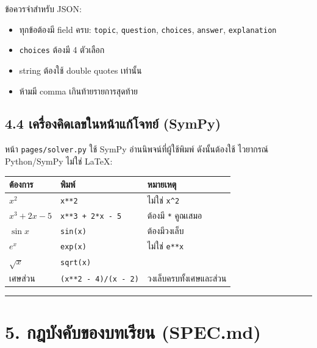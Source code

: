 \documentclass[
  thai,
  12pt,
  letterpaper,
  DIV=11,
  numbers=noendperiod]{scrartcl}
\newcounter{none} %
\providecommand{\tightlist}{%
  \setlength{\itemsep}{0pt}\setlength{\parskip}{0pt}}
\begin{document}
ข้อควรจำสำหรับ JSON:

\begin{itemize}
\tightlist
\item
  ทุกข้อต้องมี field ครบ: \texttt{topic}, \texttt{question},
  \texttt{choices}, \texttt{answer}, \texttt{explanation}
\item
  \texttt{choices} ต้องมี 4 ตัวเลือก
\item
  string ต้องใช้ double quotes เท่านั้น
\item
  ห้ามมี comma เกินท้ายรายการสุดท้าย
\end{itemize}

\subsection{4.4 เครื่องคิดเลขในหน้าแก้โจทย์
(SymPy)}\label{uxe40uxe04uxe23uxe2duxe07uxe04uxe14uxe40uxe25uxe02uxe43uxe19uxe2buxe19uxe32uxe41uxe01uxe42uxe08uxe17uxe22-sympy}

หน้า \texttt{pages/solver.py} ใช้ SymPy อ่านนิพจน์ที่ผู้ใช้พิมพ์ ดังนั้นต้องใช้ ไวยากรณ์
Python/SymPy ไม่ใช่ LaTeX:

{\def\LTcaptype{none} %
\begin{longtable}[]{@{}lll@{}}
\toprule\noalign{}
ต้องการ & พิมพ์ & หมายเหตุ \\
\midrule\noalign{}
\endhead
\bottomrule\noalign{}
\endlastfoot
\(x^2\) & \texttt{x**2} & ไม่ใช่ \texttt{x\^{}2} \\
\(x^3 + 2x - 5\) & \texttt{x**3\ +\ 2*x\ -\ 5} & ต้องมี \texttt{*}
คูณเสมอ \\
\(\sin x\) & \texttt{sin(x)} & ต้องมีวงเล็บ \\
\(e^x\) & \texttt{exp(x)} & ไม่ใช่ \texttt{e**x} \\
\(\sqrt{x}\) & \texttt{sqrt(x)} & \\
เศษส่วน & \texttt{(x**2\ -\ 4)/(x\ -\ 2)} & วงเล็บครบทั้งเศษและส่วน \\
\end{longtable}
}

\begin{center}\rule{0.5\linewidth}{0.5pt}\end{center}

\section{5. กฎบังคับของบทเรียน
(SPEC.md)}\label{uxe01uxe0euxe1auxe07uxe04uxe1auxe02uxe2duxe07uxe1auxe17uxe40uxe23uxe22uxe19-spec.md}
\end{document}
